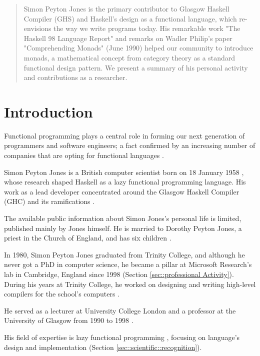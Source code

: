 \documentclass[twocolumn, 9pt]{article}
\begin{document}
\maketitle


\begin{abstract}
Simon Peyton Jones is the primary contributor to Glasgow Haskell Compiler (GHS) and Haskell's design as a functional language, which re-envisions the way we write programs today. His remarkable work "The Haskell 98 Language Report" and remarks on Wadler Philip's paper "Comprehending Monads" (June 1990) helped our community to introduce monads, a mathematical concept from category theory as a standard functional design pattern. We present a summary of his personal activity and contributions as a researcher.
\end{abstract}


\section{Introduction}
Functional programming plays a central role in forming our next generation of programmers and software engineers; a fact confirmed by an increasing number of companies that are opting for functional languages \cite{tiobe:index}.

Simon Peyton Jones is a British computer scientist born on 18 January 1958 \cite{wiki:jones}, whose research shaped Haskell as a lazy functional programming language. His work as a lead developer concentrated around the Glasgow Haskell Compiler (GHC) and its ramifications \cite{wiki:jones}.

The available public information about Simon Jones's personal life is limited, published mainly by Jones himself. He is married to Dorothy Peyton Jones, a priest in the Church of England, and has six children \cite{microsoft:jones}.

In 1980, Simon Peyton Jones graduated from Trinity College, and although he never got a PhD in computer science, he became a pillar at Microsoft Research's lab in Cambridge, England \cite{jones} since 1998 \cite{wiki:jones} (Section \ref{sec::professional Activity}). During his years at Trinity College, he worked on designing and writing high-level compilers for the school's computers \cite{jones}.

He served as a lecturer at University College London and a professor at the University of Glasgow from 1990 to 1998 \cite{wiki:jones}.

His field of expertise is lazy functional programming \cite{jones}, focusing on language's design and implementation (Section \ref{sec::scientific::recognition}).
\end{document}
